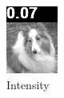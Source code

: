 \begin{figure}[H]
\begin{subfigure}[t]{0.15\textwidth}
    \includegraphics[width=\linewidth]{img/one-trial/loss_eval/L1/stimulus_1_value_shift_0.07_L1.png}
    \caption{Intensity}
  \end{subfigure}
  \begin{subfigure}[t]{0.15\textwidth}
    \centering

\end{subfigure}
\end{figure}
